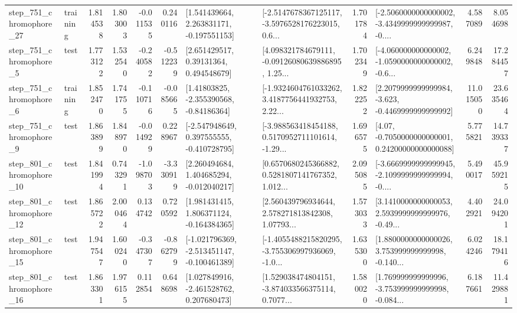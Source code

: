 \begin{tabular}{llrrrrllrlrr}
  step\_751\_chromophore\_27 &  training &      1.814538 &    1.803003 &     -0.011535 &  0.240116 &    [1.541439664, 2.263831171, -0.197551153] &  [-2.5147678367125117, -3.5976528176223015, 0.6... &       1.701784 &  [-2.5060000000000002, -3.4349999999999987, -0.... &            4.587089 &          8.054698 \\
   step\_751\_chromophore\_5 &      test &      1.773122 &    1.532540 &     -0.240582 & -0.512239 &      [2.651429517, 0.39131364, 0.494548679] &  [4.098321784679111, -0.09126080639886895, 1.25... &       1.702349 &  [-4.060000000000002, -1.0590000000000002, -0.6... &            6.249848 &         17.284457 \\
   step\_751\_chromophore\_6 &  training &      1.852470 &    1.741755 &     -0.110716 & -0.085665 &     [1.41803825, -2.355390568, -0.84186364] &  [-1.9324604761033262, 3.4187756441932753, 2.22... &       1.822252 &  [2.2079999999999984, -3.623, -0.4469999999999992] &           11.015050 &         23.635464 \\
   step\_751\_chromophore\_9 &      test &      1.863899 &    1.848970 &     -0.014929 &  0.228967 &   [-2.547948649, 0.397555555, -0.410728795] &  [-3.988563418454188, 0.5170952711101614, -1.29... &       1.696575 &   [4.07, -0.7050000000000001, 0.24200000000000088] &            5.775821 &         14.739337 \\
  step\_801\_chromophore\_10 &      test &      1.841994 &    0.743291 &     -1.098703 & -3.330919 &    [2.260494684, 1.404685294, -0.012040217] &  [0.6570680245366882, 0.5281807141767352, 1.012... &       2.095085 &  [-3.6669999999999945, -2.1099999999999994, -0.... &            5.490017 &         45.959215 \\
  step\_801\_chromophore\_12 &      test &      1.865722 &    2.000464 &      0.134742 &  0.720592 &    [1.981431415, 1.806371124, -0.164384365] &  [2.560439796934644, 2.578271813842308, 1.07793... &       1.573033 &  [3.1410000000000053, 2.5939999999999976, -0.49... &            4.402921 &         24.094201 \\
  step\_801\_chromophore\_15 &      test &      1.947547 &    1.600240 &     -0.347307 & -0.862799 &  [-1.021796369, -2.513451147, -0.100461389] &  [-1.4055488215820295, -3.755306997936069, -1.0... &       1.635300 &  [1.8800000000000026, 3.753999999999998, -0.140... &            6.024246 &         18.179416 \\
  step\_801\_chromophore\_16 &      test &      1.863301 &    1.976155 &      0.112854 &  0.648698 &    [1.027849916, -2.461528762, 0.207680473] &  [1.529038474804151, -3.874033566375114, 0.7077... &       1.580020 &  [1.769999999999996, -3.753999999999998, -0.084... &            6.187661 &         11.429881 \\

\end{tabular}
